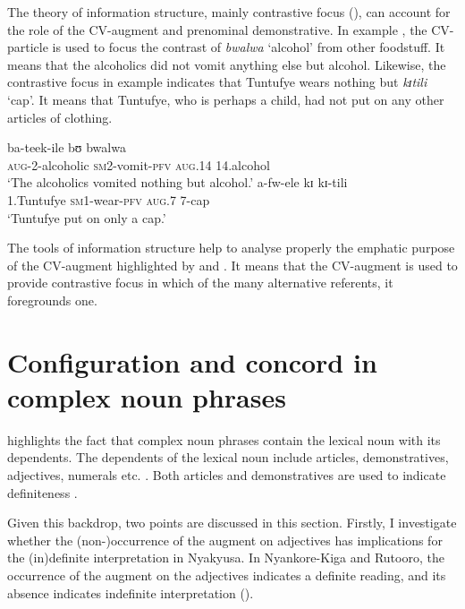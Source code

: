 \documentclass[output=paper]{langscibook}
\begin{document}
The theory of information structure, mainly contrastive focus (\citealt{Aboh2004, Repp2010}), can account for the role of the CV-aug\-ment and prenominal demonstrative. In example , the CV-particle is used to focus the contrast of \textit{bwalwa} ‘alcohol’ from other foodstuff. It means that the alcoholics did not vomit anything else but alcohol. Likewise, the contrastive focus in example  indicates that {Tuntufye} wears nothing but \textit{kɪtili} ‘cap’. It means that {Tuntufye}, who is perhaps a child, had not put on any other articles of clothing.   

\ea%
    \label{ex:lusekelo:26}
  {ba-teek-ile}  {bʊ}        {bwalwa} \\
  \textsc{aug}-2-alcoholic  \textsc{sm}2-vomit-\textsc{pfv}  \textsc{aug}.14  14.alcohol \\
\glt  ‘The alcoholics vomited nothing but alcohol.’
\ex \label{ex:lusekelo:27}  
  {a-fw-ele}  {kɪ}      {kɪ{}-tili} \\
  1.Tuntufye  \textsc{sm}1-wear-\textsc{pfv}  \textsc{aug}.7  7-cap  \\
\glt  ‘Tuntufye put on only a cap.’ 
\z

The tools of information structure help to analyse properly the emphatic purpose of the CV-aug\-ment highlighted by \citet{DeBlois1970} and \citet{Persohn2017}. It means that the CV-aug\-ment is used to provide contrastive focus in which of the many alternative referents, it foregrounds one. 

\section{Configuration and concord in complex noun phrases} \label{sec:lusekelo:3}

\citet{Rijkhoff2002} highlights the fact that complex noun phrases contain the lexical noun with its dependents. The dependents of the lexical noun include articles, demonstratives, adjectives, numerals etc. \citep{AlexiadouEtAl2007}. Both articles and demonstratives are used to indicate definiteness \citep{Lyons1999}.  

Given this backdrop, two points are discussed in this section. Firstly, I investigate whether the (non-)occurrence of the augment on adjectives has implications for the (in)definite interpretation in Nyakyusa. In Nyankore-Kiga and Rutooro, the occurrence of the augment on the adjectives indicates a definite reading, and its absence indicates indefinite interpretation (\citealt{Kaji2009, Asiimwe2014}).   
\end{document}
